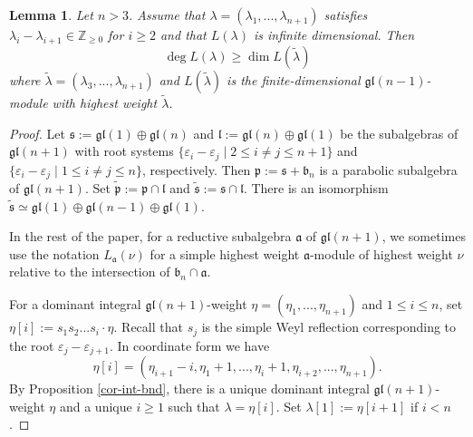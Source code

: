 \documentclass[12pt]{amsart}
\newcommand{\Z}{{\mathbb Z}}
\def\ga{\mathfrak{a}}
\def\gb{\mathfrak{b}}
\def\gl{\mathfrak{l}}
\def\gp{\mathfrak{p}}
\def\gs{\mathfrak{s}}
\def\Z{\mathbb{Z}}
\newtheorem{lem}[thm]{Lemma}
\begin{document}
\begin{lem} \label{lemma-deg}Let $n>3$. Assume that $\lambda = (\lambda_1,...,\lambda_{n+1})$ satisfies  $\lambda_i - \lambda_{i+1} \in \Z_{\geq 0}$ for $i \geq 2$ and  that $L (\lambda)$ is infinite dimensional. Then 
$$
\deg L (\lambda) \geq \dim L(\widetilde{\lambda})
$$
where $\widetilde{\lambda} = (\lambda_3,...,\lambda_{n+1})$ and $L(\widetilde{\lambda})$ is  the finite-dimensional $\mathfrak{gl} (n-1)$-module with highest weight $\tilde\lambda$.

\end{lem}
\begin{proof} 
Let  $\gs :=\mathfrak{gl}(1) \oplus  \mathfrak{gl}(n)$ and $\gl :=\mathfrak{gl}(n) \oplus  \mathfrak{gl}(1)$ be the subalgebras of $\mathfrak{gl}(n+1)$ with root systems $\{\varepsilon_i - \varepsilon_j \; | \; 2\leq i \neq j \leq n+1 \}$ and $\{\varepsilon_i - \varepsilon_j \; | \; 1\leq i \neq j \leq n \}$, respectively. Then $\gp:= \gs +\gb_n$ is a parabolic subalgebra of $\mathfrak{gl}({n+1})$. Set $\widetilde{\gp} := \gp \cap {\mathfrak l}$ and  $\widetilde{\gs} := \gs \cap {\mathfrak l}$. There is an isomorphism  $\widetilde{\gs} \simeq \mathfrak{gl}(1) \oplus  \mathfrak{gl}({n-1}) \oplus \mathfrak{gl}(1)$.

 In the rest of the paper,  for a reductive subalgebra $\ga$ of  $\mathfrak{gl}(n+1)$, we  sometimes use the notation $L_{\ga} (\nu)$ for a simple highest weight $\ga$-module of highest weight $\nu$ relative to the intersection of $\gb_n \cap \ga$. 

For a dominant integral $\mathfrak{gl}({n+1})$-weight $\eta = (\eta_1,...,\eta_{n+1})$ and $1\leq i \leq n$, set $\eta [i] := s_1s_2...s_i \cdot \eta$. Recall that $s_j$ is the simple Weyl reflection corresponding to the root $\varepsilon_j - \varepsilon_{j+1}$. In coordinate form we have
$$
\eta [i] = (\eta_{i+1} -i, \eta_1 + 1,..., \eta_{i} + 1, \eta_{i+2},...,\eta_{n+1}).
$$
By Proposition \ref{cor-int-bnd}, there is a unique dominant integral $\mathfrak{gl}({n+1})$-weight $\eta$ and  a unique $i \geq 1$ such that $\lambda = \eta[i]$. Set $\lambda[1] := \eta[i+1]$ if $i<n$.


\end{proof}
\end{document}
